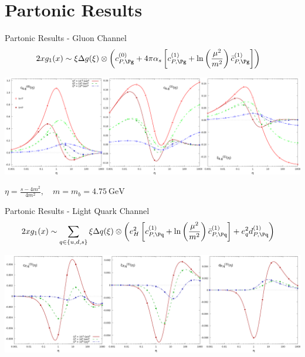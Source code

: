 \section{Partonic Results}
\begin{frame}{Partonic Results - Gluon Channel}
\begin{align}
2xg_1(x) &\sim \xi\Delta g(\xi) \otimes \left(c_{P,\Pg}^{(0)} + 4\pi\alpha_s\left[c_{P,\Pg}^{(1)} + \ln\left(\frac{\mu^2}{m^2}\right)\bar c_{P,\Pg}^{(1)}\right]\right)
\end{align}
\begin{center}
\includegraphics[width=\textwidth]{img/cgTP}
\end{center}
$\eta = \frac{s-4m^2}{4m^2},\quad m=m_b=\SI{4.75}{\GeV}$
\end{frame}

\begin{frame}{Partonic Results - Light Quark Channel}
\begin{align}
2xg_1(x) &\sim \sum_{q\in\{u,d,s\}}\xi\Delta q(\xi) \otimes \left(e_H^2\left[c_{P,\Pq}^{(1)} + \ln\left(\frac{\mu^2}{m^2}\right)\bar c_{P,\Pq}^{(1)}\right] + e_q^2 d_{P,\Pq}^{(1)}\right)
\end{align}
\begin{center}
\includegraphics[width=\textwidth]{img/cdqP}
\end{center}
\end{frame}
